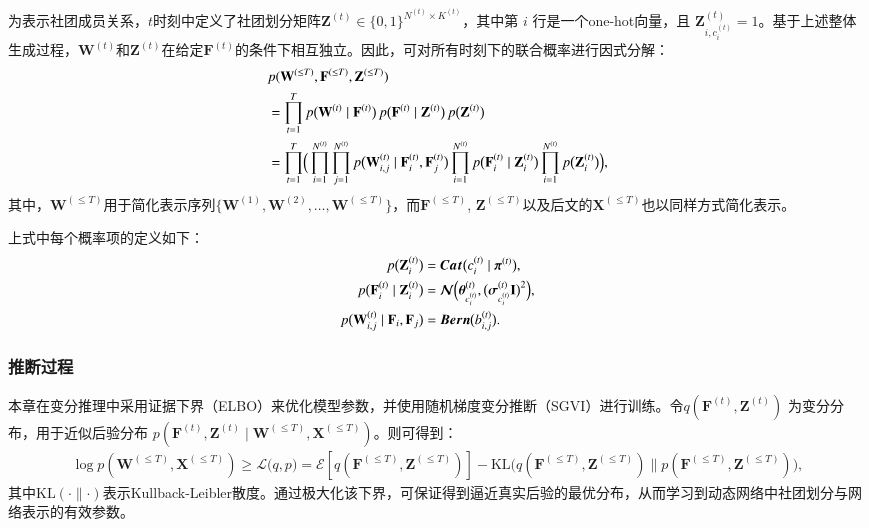 为表示社团成员关系，$t$时刻中定义了社团划分矩阵$\mathbf{Z}^{(t)} \in \{0,1\}^{N^{(t)}\times K^{(t)}}$，其中第 $i$ 行是一个one-hot向量，且 $\mathbf{Z}^{(t)}_{i,c_i^{(t)}} = 1$。基于上述整体生成过程，$\mathbf{W}^{(t)}$和$\mathbf{Z}^{(t)}$在给定$\mathbf{F}^{(t)}$的条件下相互独立。因此，可对所有时刻下的联合概率进行因式分解：
\begin{align}
    & p( \mathbf{W}^{(\leq T)},\mathbf{F}^{(\leq T)},  \mathbf{Z}^{(\leq T)}) \nonumber \\ 
    &=\prod_{t=1}^{T} p\bigl(\mathbf{W}^{(t)} \mid \mathbf{F}^{(t)}\bigr)\, p\bigl(\mathbf{F}^{(t)} \mid \mathbf{Z}^{(t)}\bigr)\, p\bigl(\mathbf{Z}^{(t)}\bigr)\label{eq:6}\\ \nonumber
    &=\prod_{t=1}^{T} \Bigl(\,\prod_{i=1}^{N^{(t)}} \prod_{j=1}^{N^{(t)}} p\bigl(\mathbf{W}_{i,j}^{(t)} \mid \mathbf{F}_{i}^{(t)}, \mathbf{F}_{j}^{(t)}\bigr)
    \prod_{i=1}^{N^{(t)}} p\bigl(\mathbf{F}_{i}^{(t)} \mid \mathbf{Z}_{i}^{(t)}\bigr)
    \prod_{i=1}^{N^{(t)}} p\bigl(\mathbf{Z}_{i}^{(t)}\bigr)\Bigr),
\end{align}
其中，$\mathbf{W}^{(\leq T)}$用于简化表示序列$\{\mathbf{W}^{(1)}, \mathbf{W}^{(2)}, \dots, \mathbf{W}^{(\leq T)} \}$，而$\mathbf{F}^{(\leq T)}$, $\mathbf{Z}^{(\leq T)}$以及后文的$\mathbf{X}^{(\leq T)}$也以同样方式简化表示。

上式中每个概率项的定义如下：
\begin{align}
    p\bigl(\mathbf{Z}_{i}^{(t)}\bigr)&=\bm{Cat}\bigl(c_i^{(t)} \mid \bm{\pi}^{(t)}\bigr), \label{eq:7}\\
    p\bigl(\mathbf{F}_{i}^{(t)} \mid \mathbf{Z}_{i}^{(t)}\bigr)&=\bm{\mathcal{N}}\Bigl(\bm{\theta}_{c_i^{(t)}}^{(t)}, \bigl(\bm{\sigma}_{c_i^{(t)}}^{(t)}\mathbf{I}\bigr)^{2}\Bigr), \label{eq:8}\\
    p\bigl(\mathbf{W}_{i,j}^{(t)} \mid \mathbf{F}_{i},\mathbf{F}_{j}\bigr)&=\bm{Bern}\bigl(b_{i,j}^{(t)}\bigr). \label{eq:91}
\end{align}

\subsubsection{推断过程}


本章在变分推理中采用证据下界（ELBO）来优化模型参数，并使用随机梯度变分推断（SGVI）进行训练。令$q(\mathbf{F}^{(t)}, \mathbf{Z}^{(t)})$ 为变分分布，用于近似后验分布 $p(\mathbf{F}^{(t)}, \mathbf{Z}^{(t)} \mid \mathbf{W}^{(\leq T)},\mathbf{X}^{(\leq T)})$。则可得到：
\begin{align}
\log p(\mathbf{W}^{(\leq T)},\mathbf{X}^{(\leq T)}) \ge \mathcal{L}\bigl(q,p\bigr) = \mathcal{E}[q(\mathbf{F}^{(\leq T)},\mathbf{Z}^{(\leq T)})] - \mathrm{KL}\bigl(q(\mathbf{F}^{(\leq T)},\mathbf{Z}^{(\leq T)})\parallel p(\mathbf{F}^{(\leq T)},\mathbf{Z}^{(\leq T)})\bigr),
\end{align}
其中$\mathrm{KL}(\cdot\parallel\cdot)$表示Kullback-Leibler散度。通过极大化该下界，可保证得到逼近真实后验的最优分布，从而学习到动态网络中社团划分与网络表示的有效参数。


